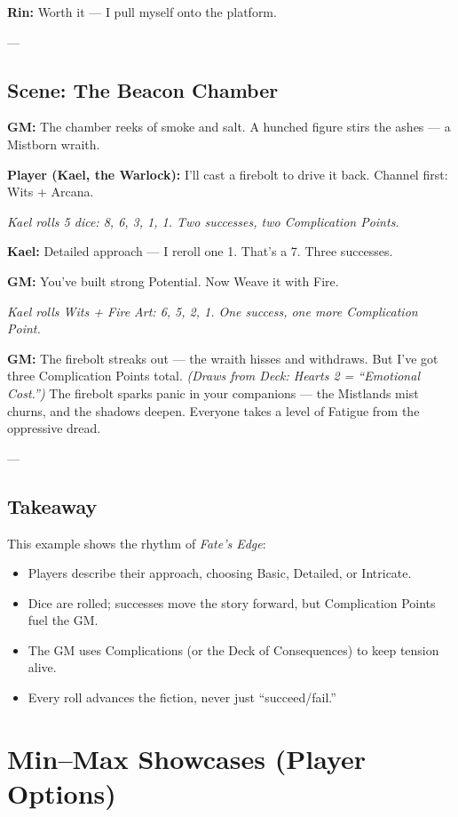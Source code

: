 \documentclass[11pt]{book}
\begin{document}
\textbf{Rin:} Worth it — I pull myself onto the platform.  

---

\subsection*{Scene: The Beacon Chamber}

\textbf{GM:} The chamber reeks of smoke and salt. A hunched figure stirs the ashes — a Mistborn wraith.  

\textbf{Player (Kael, the Warlock):} I’ll cast a firebolt to drive it back. Channel first: Wits + Arcana.  

\textit{Kael rolls 5 dice: 8, 6, 3, 1, 1. Two successes, two Complication Points.}  

\textbf{Kael:} Detailed approach — I reroll one 1. That’s a 7. Three successes.  

\textbf{GM:} You’ve built strong Potential. Now Weave it with Fire.  

\textit{Kael rolls Wits + Fire Art: 6, 5, 2, 1. One success, one more Complication Point.}  

\textbf{GM:} The firebolt streaks out — the wraith hisses and withdraws. But I’ve got three Complication Points total.  
\textit{(Draws from Deck: Hearts 2 = “Emotional Cost.”)}  
The firebolt sparks panic in your companions — the Mistlands mist churns, and the shadows deepen. Everyone takes a level of Fatigue from the oppressive dread.  

---

\subsection*{Takeaway}
This example shows the rhythm of \textit{Fate’s Edge}:
\begin{itemize}
  \item Players describe their approach, choosing Basic, Detailed, or Intricate.  
  \item Dice are rolled; successes move the story forward, but Complication Points fuel the GM.  
  \item The GM uses Complications (or the Deck of Consequences) to keep tension alive.  
  \item Every roll advances the fiction, never just “succeed/fail.”  
\end{itemize}

\section*{Min–Max Showcases (Player Options)}
\end{document}

